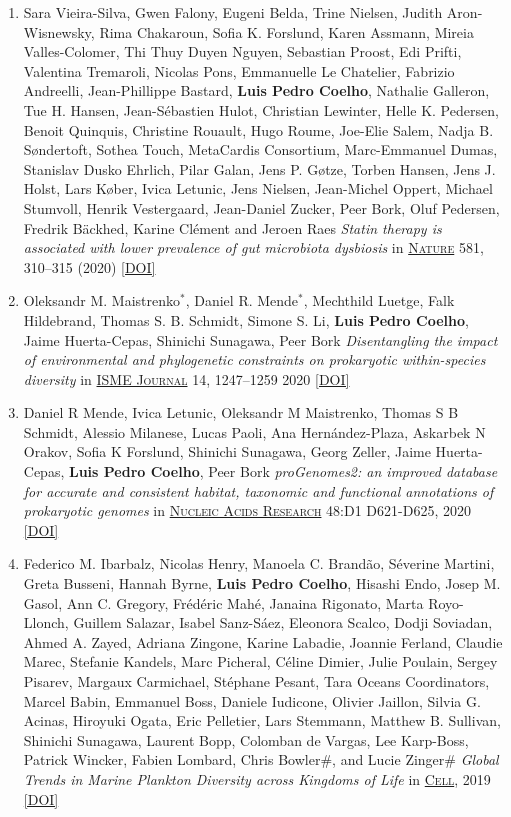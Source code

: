 \documentclass{article}
\newcommand\showdoi[1]{%
    \href{https://doi.org/#1}{[DOI]}%
}
\newcommand\pubname[1]{\textsc{\uline{#1}}}
\newcommand\costar{${}^{*}$}
\begin{document}
\begin{enumerate}[resume]
\item Sara Vieira-Silva, Gwen Falony, Eugeni Belda, Trine Nielsen, Judith
Aron-Wisnewsky, Rima Chakaroun, Sofia K. Forslund, Karen Assmann, Mireia
Valles-Colomer, Thi Thuy Duyen Nguyen, Sebastian Proost, Edi Prifti, Valentina
Tremaroli, Nicolas Pons, Emmanuelle Le Chatelier, Fabrizio Andreelli,
Jean-Phillippe Bastard, \textbf{Luis Pedro Coelho}, Nathalie Galleron, Tue H.
Hansen, Jean-Sébastien Hulot, Christian Lewinter, Helle K. Pedersen, Benoit
Quinquis, Christine Rouault, Hugo Roume, Joe-Elie Salem, Nadja B. Søndertoft,
Sothea Touch, MetaCardis Consortium, Marc-Emmanuel Dumas, Stanislav Dusko
Ehrlich, Pilar Galan, Jens P. Gøtze, Torben Hansen, Jens J. Holst, Lars Køber,
Ivica Letunic, Jens Nielsen, Jean-Michel Oppert, Michael Stumvoll, Henrik
Vestergaard, Jean-Daniel Zucker, Peer Bork, Oluf Pedersen, Fredrik Bäckhed,
Karine Clément and Jeroen Raes \emph{Statin therapy is associated with lower
prevalence of gut microbiota dysbiosis} in \pubname{Nature} 581, 310–315 (2020)
\showdoi{10.1038/s41586-020-2269-x}

\item Oleksandr M. Maistrenko\costar,  Daniel R. Mende\costar,  Mechthild
Luetge, Falk Hildebrand,  Thomas S. B. Schmidt,  Simone S. Li, \textbf{Luis
Pedro Coelho},  Jaime Huerta-Cepas,  Shinichi Sunagawa,  Peer Bork
\emph{Disentangling the impact of environmental and phylogenetic constraints on
prokaryotic within-species diversity} in \pubname{ISME Journal} 14, 1247–1259
2020 \showdoi{10.1038/s41396-020-0600-z}

\item Daniel R Mende, Ivica Letunic, Oleksandr M Maistrenko, Thomas S B Schmidt,
Alessio Milanese, Lucas Paoli, Ana Hernández-Plaza, Askarbek N Orakov, Sofia K
Forslund, Shinichi Sunagawa, Georg Zeller, Jaime Huerta-Cepas, \textbf{Luis
Pedro Coelho}, Peer Bork \emph{proGenomes2: an improved database for accurate
and consistent habitat, taxonomic and functional annotations of prokaryotic
genomes} in \pubname{Nucleic Acids Research} 48:D1 D621-D625, 2020
\showdoi{10.1093/nar/gkz1002}

\item Federico M. Ibarbalz, Nicolas Henry, Manoela C. Brandão, Séverine
Martini, Greta Busseni, Hannah Byrne, \textbf{Luis Pedro Coelho}, Hisashi Endo,
Josep M. Gasol, Ann C. Gregory, Frédéric Mahé, Janaina Rigonato, Marta
Royo-Llonch, Guillem Salazar, Isabel Sanz-Sáez, Eleonora Scalco, Dodji
Soviadan, Ahmed A. Zayed, Adriana Zingone, Karine Labadie, Joannie Ferland,
Claudie Marec, Stefanie Kandels, Marc Picheral, Céline Dimier, Julie Poulain,
Sergey Pisarev, Margaux Carmichael, Stéphane Pesant, Tara Oceans Coordinators,
Marcel Babin, Emmanuel Boss, Daniele Iudicone, Olivier Jaillon, Silvia G.
Acinas, Hiroyuki Ogata, Eric Pelletier, Lars Stemmann, Matthew B. Sullivan,
Shinichi Sunagawa, Laurent Bopp, Colomban de Vargas, Lee Karp-Boss, Patrick
Wincker, Fabien Lombard, Chris Bowler\#, and Lucie Zinger\# \emph{Global Trends
in Marine Plankton Diversity across Kingdoms of Life} in \pubname{Cell}, 2019
\showdoi{10.1016/j.cell.2019.10.008}


\end{enumerate}
\end{document}
